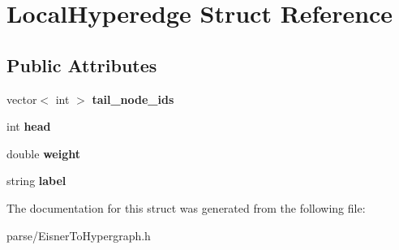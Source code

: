 \hypertarget{struct_local_hyperedge}{
\section{LocalHyperedge Struct Reference}
\label{struct_local_hyperedge}
}
\subsection*{Public Attributes}
\begin{DoxyCompactItemize}
\item 
\hypertarget{struct_local_hyperedge_a94cbc62434996702ca1d0e28b6dde622}{
vector$<$ int $>$ {\bfseries tail\_\-node\_\-ids}}
\label{struct_local_hyperedge_a94cbc62434996702ca1d0e28b6dde622}

\item 
\hypertarget{struct_local_hyperedge_a71c8831cc00fefbfb29575856a22fc8a}{
int {\bfseries head}}
\label{struct_local_hyperedge_a71c8831cc00fefbfb29575856a22fc8a}

\item 
\hypertarget{struct_local_hyperedge_a875e26d7749b13e387b7f0978a4f97a5}{
double {\bfseries weight}}
\label{struct_local_hyperedge_a875e26d7749b13e387b7f0978a4f97a5}

\item 
\hypertarget{struct_local_hyperedge_ae1b43e113b237128ed95691034ec715e}{
string {\bfseries label}}
\label{struct_local_hyperedge_ae1b43e113b237128ed95691034ec715e}

\end{DoxyCompactItemize}


The documentation for this struct was generated from the following file:\begin{DoxyCompactItemize}
\item 
parse/EisnerToHypergraph.h\end{DoxyCompactItemize}
